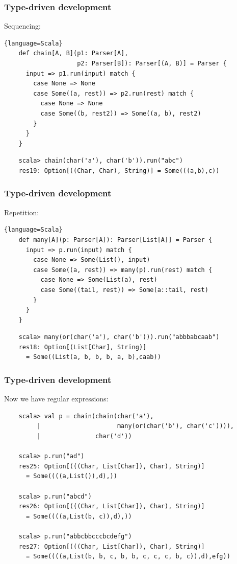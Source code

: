 \documentclass{beamer}
\begin{document}
\begin{frame}[containsverbatim]
  \frametitle{Type-driven development} 

  Sequencing:

  \begin{lstlisting}{language=Scala}
    def chain[A, B](p1: Parser[A],
                    p2: Parser[B]): Parser[(A, B)] = Parser {
      input => p1.run(input) match {
        case None => None
        case Some((a, rest)) => p2.run(rest) match {
          case None => None
          case Some((b, rest2)) => Some((a, b), rest2)
        }
      }
    }
  \end{lstlisting}

  \begin{lstlisting}
    scala> chain(char('a'), char('b')).run("abc")
    res19: Option[((Char, Char), String)] = Some(((a,b),c))
  \end{lstlisting}
  
\end{frame}



\begin{frame}[containsverbatim]
  \frametitle{Type-driven development} 

  Repetition:

  \begin{lstlisting}{language=Scala}
    def many[A](p: Parser[A]): Parser[List[A]] = Parser {
      input => p.run(input) match {
        case None => Some(List(), input)
        case Some((a, rest)) => many(p).run(rest) match {
          case None => Some(List(a), rest)
          case Some((tail, rest)) => Some(a::tail, rest)
        }               
      }
    }
  \end{lstlisting}

  \begin{lstlisting}
    scala> many(or(char('a'), char('b'))).run("abbbabcaab")
    res18: Option[(List[Char], String)] 
      = Some((List(a, b, b, b, a, b),caab))
  \end{lstlisting}
  
\end{frame}

\begin{frame}[containsverbatim]
  \frametitle{Type-driven development} 

  Now we have regular expressions:

  \begin{lstlisting}
    scala> val p = chain(chain(char('a'), 
         |                     many(or(char('b'), char('c')))),
         |               char('d'))

    scala> p.run("ad")
    res25: Option[(((Char, List[Char]), Char), String)] 
      = Some((((a,List()),d),))

    scala> p.run("abcd")
    res26: Option[(((Char, List[Char]), Char), String)] 
      = Some((((a,List(b, c)),d),))

    scala> p.run("abbcbbcccbcdefg")
    res27: Option[(((Char, List[Char]), Char), String)] 
      = Some((((a,List(b, b, c, b, b, c, c, c, b, c)),d),efg))
  \end{lstlisting}
  
\end{frame}
\end{document}
